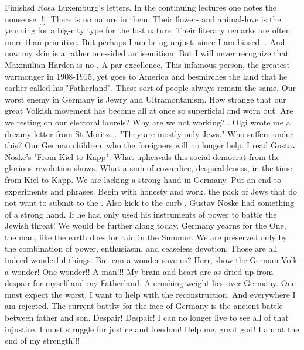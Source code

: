 
Finishsd Rosa Luxemburg's letters. In the continuing lectures one notes the nonsense [!]. There is no nature in them. Their flower- and animal-love is the yearning for a big-city type for the lost nature. Their literary remarks are often more than primitive. But perhaps I am being unjust, since I am biased. . And now my skin is a rather one-sided antisemitism. But I will never recognize that Maximilian Harden is no . A  par excellence. This infamous person, the greatest warmonger in 1908-1915, yet goes to America and besmirches the land that he earlier called his "Fatherland". These sort of people always remain the same. Our worst enemy in Germany is Jewry and Ultramontanism. How strange that our great Volkish movement has become all at once so superficial and worn out. Are we resting on our electoral laurels? Why are we not working? . Olgi wrote me a dreamy letter from St Moritz. . "They are mostly only Jews." Who suffers under this? Our German children, who the foreigners will no longer help. I read Gustav Noske's "From Kiel to Kapp". What upheavals this social democrat from the glorious revolution shows. What a sum of cowardice, despicableness,  in the time from Kiel to Kapp. We are lacking a strong hand in Germany. Put an end to experiments and phrases. Begin with honesty and work.  the pack of Jews that do not want to submit to the . Also kick to the curb . Gustav Noske had something of a strong hand. If he had only used his instruments of power to battle the Jewish threat! We would be further along today. Germany yearns for the One, the man, like the earth does for rain in the Summer. We are preserved only by the combination of power, enthusiasm, and ceaseless devotion. Those are all indeed wonderful things. But can a wonder save us? Herr, show the German Volk a wonder! One wonder!! A man!!!  My brain and heart are as dried-up from despair for myself and my Fatherland. A crushing weight lies over Germany. One must expect the worst. I want to help with the reconstruction. And everywhere I am rejected. The current battlw for the face of Germany is the ancient battle between father and son. Despair! Despair! I can no longer live to see all of that injustice. I must struggle for justice and freedom! Help me, great god! I am at the end of my strength!!!

